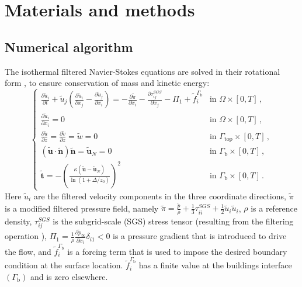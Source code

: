 \section{Materials and methods}

\subsection{Numerical algorithm}

The isothermal filtered Navier-Stokes equations are solved in their rotational form \citep{Orszag1975}, to ensure conservation of mass and kinetic energy: 
%
\begin{equation}
\begin{cases}
   \frac{\partial \tilde{u}_i}{\partial t} 
      + \tilde{u}_j ( \frac{\partial \tilde{u}_i}{\partial x_j} 
      - \frac{\partial \tilde{u}_j}{\partial x_i} ) 
      = 
      - \frac{\partial \tilde{\pi}}{\partial x_i} 
      - \frac{\partial \tau_{ij}^{SGS}}{\partial x_j} 
      - \Pi_1  + \tilde{f}_i^{\Gamma_{\mathrm{b}}} & \text{in $\Omega \times [0,T]$} \, , \\
   	\frac{\partial \tilde{u}_i}{\partial x_i} =0 & \text{in $\Omega \times [0,T]$} \, , \\
	\frac{\partial \tilde{u}}{\partial z} = \frac{\partial \tilde{v}}{\partial z} = 
	\tilde{w} = 0 & \text{in $\Gamma_{\mathrm{top}} \times [0,T]$} \, , \\
	(\mathbf{\tilde{u}} \cdot \mathbf{\tilde{n}}) \mathbf{\tilde{n}} = \mathbf{\tilde{u}}_N = 0 & \text{in $\Gamma_{\mathrm{b}} \times [0,T]$} \, , \\
	\mathbf{\tilde{t}} = - \left( \frac{ \kappa ( \mathbf{\tilde{u}} - \mathbf{\tilde{u}}_N )}{\ln{(1+\Delta/z_0)}} \right)^2 & \text{in $\Gamma_{\mathrm{b}} \times [0,T]$} \, .
	\label{eq_motions}
\end{cases}
\end{equation}
%
Here $\tilde{u}_i$ are the filtered velocity components in the three coordinate directions, $\tilde{\pi}$ is a modified filtered pressure field, namely $  \tilde{\pi} = \frac{\tilde{p}}{\rho} + \frac{1}{3}\tau_{ii}^{SGS} + \frac{1}{2}\tilde{u}_i\tilde{u}_i $, $\rho$ is a reference density, $\tau_{ij}^{SGS}$ is the subgrid-scale (SGS) stress tensor (resulting from the filtering operation \citep{Pope2000a}), $ \Pi_1 = \frac{1}{\rho} \frac{\partial \tilde{p}_{\infty}}{\partial x_i}\delta_{i1} < 0$ is a pressure gradient that is introduced to drive the flow, and $\tilde{f}_i^{\Gamma_{\mathrm{b}}}$ is a forcing term that is used to impose the desired boundary condition at the surface location. $\tilde{f}_i^{\Gamma_{\mathrm{b}}}$ has a finite value at the buildings interface $(\Gamma_{\mathrm{b}})$ and is zero elsewhere.
